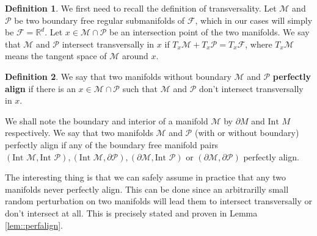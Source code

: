 \documentclass{article} %
\newcommand\manP{\mathcal{P}}
\newcommand\manM{\mathcal{M}}
\newcommand\Int{\text{Int }}
\newcommand\RR{\mathbb{R}}
\theoremstyle{definition}
\newtheorem{definition}{Definition}[section]
\begin{document}
\begin{definition} We first need to recall the definition of transversality. Let $\manM$ and $\manP$
be two boundary free regular submanifolds of $\mathcal{F}$, which in our cases will simply be $\mathcal{F}
= \RR^d$. Let $x \in \manM \cap \manP$ be an intersection point of the two manifolds.
We say that $\manM$ and $\manP$ intersect transversally in $x$
if $T_x \manM + T_x \manP = T_x \mathcal{F}$, where $T_x \manM$ means the tangent space of $\manM$
around $x$.
\end{definition}
\vspace{1mm}

\begin{definition}
We say that two manifolds without boundary $\mathcal{M}$ and $\mathcal{P}$ \textbf{perfectly align} if there
is an $x \in \mathcal{M} \cap \mathcal{P}$ such that $\mathcal{M}$ and $\mathcal{P}$ don't
intersect transversally in $x$.
\vspace{-2mm}

We shall note the boundary and interior of a manifold $\manM$ by $\partial M$ and $\Int M$ respectively.
We say that two manifolds $\manM$ and $\manP$
(with or without boundary) perfectly align if any of the boundary free manifold pairs 
$(\Int \manM, \Int \manP), (\Int \manM, \partial \manP), (\partial \manM, \Int \manP)$ or
$(\partial \manM, \partial \manP)$ perfectly align.
\end{definition}
The interesting thing is that we can safely assume in practice that any two manifolds never perfectly
align. This can be done
since an arbitrarilly small random perturbation on two
manifolds will lead them to intersect transversally or don't intersect at all. This
is precisely stated and proven in Lemma \autoref{lem::perfalign}.
\end{document}
